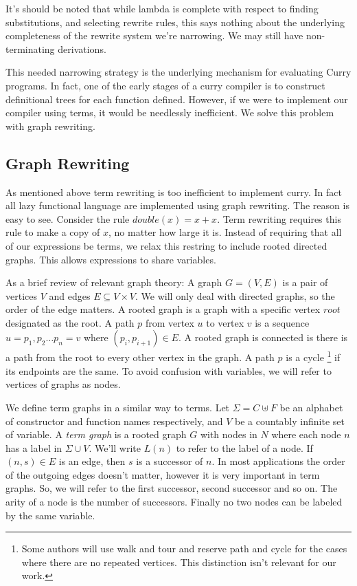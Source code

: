 \documentclass{article}
\theoremstyle{definition}
\begin{document}
It's should be noted that while lambda is complete with respect to finding substitutions, and selecting rewrite rules,
this says nothing about the underlying completeness of the rewrite system we're narrowing.
We may still have non-terminating derivations.

This needed narrowing strategy is the underlying mechanism for evaluating Curry programs.
In fact, one of the early stages of a curry compiler is to construct definitional trees for each function defined.
However, if we were to implement our compiler using terms, it would be needlessly inefficient.
We solve this problem with graph rewriting.

\subsection{Graph Rewriting}
As mentioned above term rewriting is too inefficient to implement curry.
In fact all lazy functional language are implemented using graph rewriting.
The reason is easy to see.
Consider the rule $double(x) = x + x$.
Term rewriting requires this rule to make a copy of $x$, no matter how large it is.
Instead of requiring that all of our expressions be terms, we relax this restring to include rooted directed graphs.
This allows expressions to share variables.

As a brief review of relevant graph theory: A graph $G = (V,E)$ is a pair of vertices $V$ and edges $E \subseteq V \times V$.
We will only deal with directed graphs, so the order of the edge matters.
A rooted graph is a graph with a specific vertex $root$ designated as the root.
A path $p$ from vertex $u$ to vertex $v$ is a sequence $u = p_1, p_2 \ldots p_n = v$ where $(p_i,p_{i+1}) \in E$.
A rooted graph is connected is there is a path from the root to every other vertex in the graph.
A path $p$ is a cycle
\footnote{Some authors will use walk and tour and
reserve path and cycle for the cases where there are no repeated vertices.
This distinction isn't relevant for our work.}
if its endpoints are the same.
To avoid confusion with variables, we will refer to vertices of graphs as nodes.

We define term graphs in a similar way to terms.
Let $\Sigma = C \uplus F$ be an alphabet of constructor and function names respectively,
and $V$ be a countably infinite set of variable.
A \textit{term graph} is a rooted graph $G$ with nodes in $N$ where each node $n$ has a label in $\Sigma \cup V$.
We'll write $L(n)$ to refer to the label of a node.
If $(n, s) \in E$ is an edge, then $s$ is a successor of $n$.
In most applications the order of the outgoing edges doesn't matter, however it is very important in term graphs.
So, we will refer to the first successor, second successor and so on.
The arity of a node is the number of successors.
Finally no two nodes can be labeled by the same variable.
\end{document}
